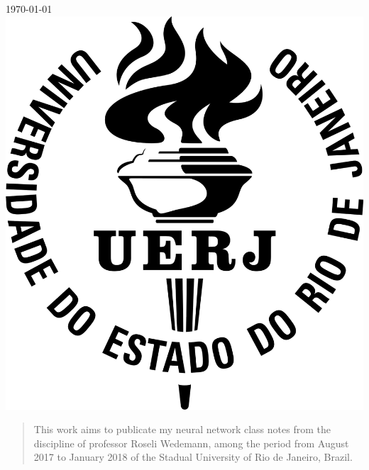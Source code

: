 \begin{titlepage}

{\large \today}\\[2cm] %


\includegraphics[scale=0.5]{Imagens/logo_uerj.png}\\[1cm] %
 

\vfill%

\end{titlepage}


\begin{abstract}
This work aims to publicate my neural network class notes from the discipline of professor Roseli Wedemann, among the period from August 2017 to January 2018 of the Stadual University of Rio de Janeiro, Brazil.
\end{abstract}

